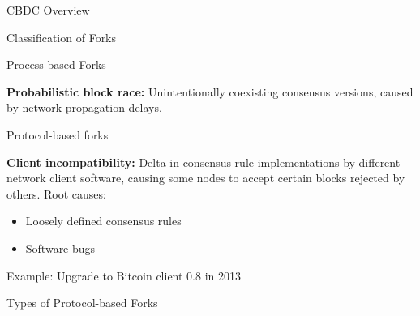 \documentclass[handout]{beamer}
\begin{document}
\begin{frame}{CBDC Overview}
\begin{frame}{Classification of Forks}
\end{frame}

\begin{frame}{Process-based Forks}

\textbf{Probabilistic block race:} Unintentionally coexisting consensus versions, caused by network propagation delays. 
\vspace{1.5em}	


	
\end{frame}

\begin{frame}{Protocol-based forks}

\textbf{Client incompatibility:} Delta in consensus rule implementations by different network client software, causing some nodes to accept certain blocks rejected by others. Root causes:
\begin{itemize}
	\item Loosely defined consensus rules
	\item Software bugs
\end{itemize}
\vspace{0.5em}
Example: Upgrade to Bitcoin client 0.8 in 2013
\vspace{1em}	


	
\end{frame}

\begin{frame}{Types of Protocol-based Forks}



\end{frame}
\end{frame}
\end{document}
